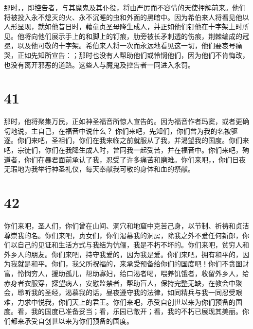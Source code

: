 那时，，即控告者，与其魔鬼及其仆役，将由严厉而不容情的天使押解前来。他们将被投入永不熄灭的火、永不沉睡的虫和外面的黑暗中。因为希伯来人将看见他以人形显现，就如他昔日时，藉童贞圣母降生成人，并正如他们钉他在十字架上时所见。他将向他们展示手上的和脚上的钉痕，肋旁被长矛刺透的伤痕，荆棘编成的冠冕，以及他可敬的十字架。希伯来人将一次而永远地看见这一切，他们要哀号痛哭，正如先知所宣告：；那时也没有人帮助他们或怜悯他们，因为他们不肯悔改，也没有离开邪恶的道路。这些人与魔鬼及控告者一同进入永罚。\par


\section{41}

那时，他将聚集万民，正如神圣福音所惊人宣告的。因为福音作者玛窦，或者更确切地说，主自己，在福音中说什么？ 你们来吧，先知们，你们曾为我的名被驱逐。你们来吧，圣祖们，你们在我来临之前就服从了我，并渴望我的国度。你们来吧，宗徒们，你们在我降生成人时，曾同我一起受苦，并在福音中。你们来吧，殉道者，你们在暴君面前承认了我，忍受了许多痛苦和磨难。你们来吧，，你们日夜无瑕地为我举行神圣礼仪，每天奉献我可敬的身体和血的祭献。\par


\section{42}

你们来吧，圣人们，你们曾在山间、洞穴和地窟中克苦己身，以节制、祈祷和贞洁尊崇我的名。你们来吧，贞女们，你们渴慕我的洞房，除我之外不爱任何新郎，你们以自己的见证和生活方式与我结为伉俪，我是不朽不坏的。你们来吧，贫穷人和外乡人的朋友。你们来吧，持守我爱的，因为我是爱。你们来吧，拥有和平的，因为我就是和平。你们，我父所祝福的，来承受预备给你们的国度吧！你们不贪图财富，怜悯穷人，援助孤儿，帮助寡妇，给口渴者喝，喂养饥饿者，收留外乡人，给赤身者衣服穿，探望病人，安慰监禁者，帮助盲人，保持完整无缺，在教会中聚会，聆听我的圣经，渴慕我的话，昼夜遵守我的法律，如同精兵与我一同忍受艰难，力求中悦我，你们天上的君王。你们来吧，承受自创世以来为你们预备的国度。看，我的国度已准备妥当；看，乐园已敞开；看，我的不朽已展现其美丽。你们都来承受自创世以来为你们预备的国度。\par

